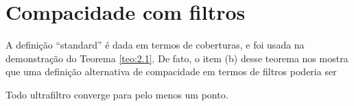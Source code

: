 \section{Compacidade com filtros}
\label{sec:compac_filtros}

 
 A definição ``standard'' é dada 
 em termos de coberturas, e foi usada
 na demonstração do Teorema \ref{teo:2.1}.
 De fato, o item (b) desse teorema nos mostra que
 uma definição alternativa de compacidade em termos
 de filtros poderia ser
 
 \begin{definition}
 \label{def:compac_filtros}
 Todo ultrafiltro converge para pelo menos
 um ponto.
 \end{definition}
 
 
